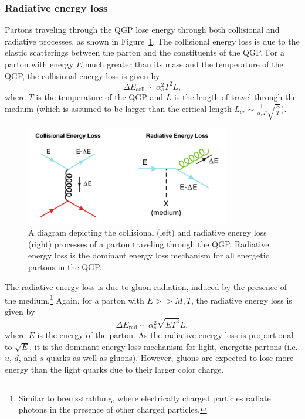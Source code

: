 \subsubsection{Radiative energy loss}
\label{sec:qgp_energy_loss}

Partons traveling through the QGP lose energy through both collisional and radiative processes, as shown in Figure~\ref{fig:energy_loss_qgp}. The collisional energy loss is due to the elastic scatterings between the parton and the constituents of the QGP. For a parton with energy $E$ much greater than its mass and the temperature of the QGP, the collisional energy loss is given by~\cite{GluonRadiation}
%
\begin{equation}
    \label{eq:collisional_energy_loss}
    \Delta E_\text{coll} \sim \alpha_s^2 T^2 L,
\end{equation}
%
where $T$ is the temperature of the QGP and $L$ is the length of travel through the medium (which is assumed to be larger than the critical length $L_{cr} \sim \frac{1}{\alpha_s T}\sqrt{\frac{E}{T}}$). 

\begin{figure}[h]
    \centering
    \includegraphics[width=0.8\textwidth]{figures/introduction/energy_loss.png}
    \caption{A diagram depicting the collisional (left) and radiative energy loss (right) processes of a parton traveling through the QGP. Radiative energy loss is the dominant energy loss mechanism for all energetic partons in the QGP.}
    \label{fig:energy_loss_qgp}
\end{figure}

The radiative energy loss is due to gluon radiation, induced by the presence of the medium.\footnote{Similar to bremsstrahlung, where electrically charged particles radiate photons in the presence of other charged particles.} Again, for a parton with $E >> M, T$, the radiative energy loss is given by
%
\begin{equation}
    \label{eq:radiative_energy_loss}
    \Delta E_\text{rad} \sim \alpha_s^2 \sqrt{E T^3} L,
\end{equation}
%
where $E$ is the energy of the parton. As the radiative energy loss is proportional to $\sqrt{E}$, it is the dominant energy loss mechanism for light, energetic partons (i.e. $u$, $d$, and $s$ quarks as well as gluons). However, gluons are expected to lose more energy than the light quarks due to their larger color charge. 

